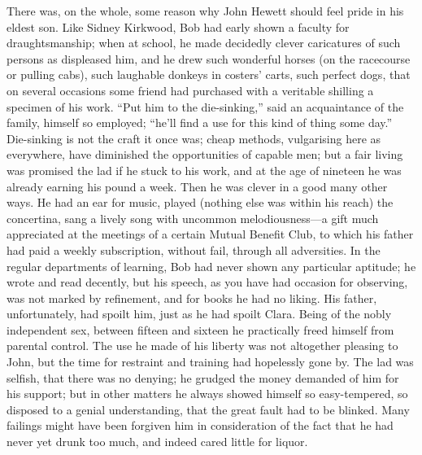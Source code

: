 There was, on the whole, some reason why John Hewett should feel pride
in his eldest son. Like Sidney Kirkwood, Bob had early shown a faculty
for draughtsmanship; when at school, he made decidedly clever
caricatures of such persons as displeased him, and he drew such
wonderful horses (on the racecourse or pulling cabs), such laughable
donkeys in costers' carts, such perfect dogs, that on several occasions
some friend had purchased with a veritable shilling a specimen of his
work. ``Put him to the die-sinking,'' said an acquaintance of the
family, himself so {}employed; ``he'll find a use for this kind of thing
some day.'' Die-sinking is not the craft it once was; cheap methods,
vulgarising here as everywhere, have diminished the opportunities of
capable men; but a fair living was promised the lad if he stuck to his
work, and at the age of nineteen he was already earning his pound a
week. Then he was clever in a good many other ways. He had an ear for
music, played (nothing else was within his reach) the concertina, sang a
lively song with uncommon melodiousness---a gift much appreciated at the
meetings of a certain Mutual Benefit Club, to which his father had paid
a weekly subscription, without fail, through all adversities. In the
regular departments of learning, Bob had never shown any particular
aptitude; he wrote and read decently, but his speech, as you have had
occasion for observing, was not marked by refinement, and for books he
had no liking. His father, unfortunately, had spoilt him, just as he had
spoilt Clara. Being of the nobly independent sex, between {}fifteen and
sixteen he practically freed himself from parental control. The use he
made of his liberty was not altogether pleasing to John, but the time
for restraint and training had hopelessly gone by. The lad was selfish,
that there was no denying; he grudged the money demanded of him for his
support; but in other matters he always showed himself so easy-tempered,
so disposed to a genial understanding, that the great fault had to be
blinked. Many failings might have been forgiven him in consideration of
the fact that he had never yet drunk too much, and indeed cared little
for liquor.

